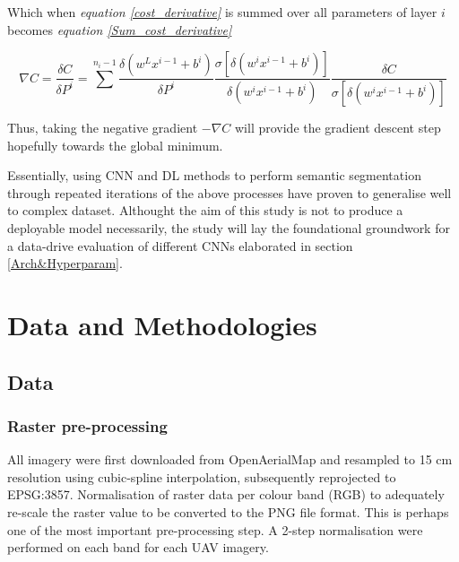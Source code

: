 \documentclass[11pt, a4paper, twoside]{report}
\begin{document}
Which when \textit{equation \ref{cost_derivative}} is summed over all parameters of layer $i$ becomes \textit{equation \ref{Sum_cost_derivative}}\\\par

\begin{equation}
  \label{Sum_cost_derivative}
  \nabla C = \frac{\delta C}{\delta P^{i}} = \sum^{n_{i}-1} \frac{\delta(w^{L}x^{i-1} + b^{i})}{\delta P^{i}} \frac{\sigma[\delta(w^{i}x^{i-1} + b^{i})]}{\delta (w^{i}x^{i-1} + b^{i})} \frac{\delta C}{\sigma[\delta(w^{i}x^{i-1} + b^{i})]}
\end{equation}

Thus, taking the negative gradient $-\nabla C$ will provide the gradient descent step hopefully towards the global minimum.\\\par

Essentially, using CNN and DL methods to perform semantic segmentation through repeated iterations of the above processes have proven to generalise well to complex dataset. Althought the aim of this study is not to produce a deployable model necessarily, the study will lay the foundational groundwork for a data-drive evaluation of different CNNs elaborated in section \ref{Arch&Hyperparam}.\\\par

\newpage

\chapter{Data and Methodologies}\label{DataandMethods}

\section{Data}\label{Data}

\subsection{Raster pre-processing}

All imagery were first downloaded from OpenAerialMap and resampled to 15 cm resolution using cubic-spline interpolation, subsequently reprojected to EPSG:3857. Normalisation of raster data per colour band (RGB) to adequately re-scale the raster value to be converted to the PNG file format. This is perhaps one of the most important pre-processing step. A 2-step normalisation were performed on each band for each UAV imagery.\\\par
\end{document}
